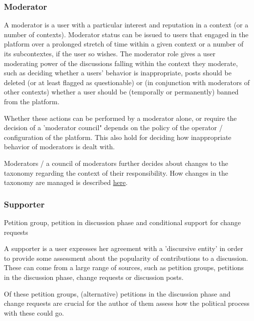 \subsubsection{Moderator}
\label{ssec:Roles_Moderator}
A moderator is a user with a particular interest and reputation in a context (or a number of contexts). Moderator status can be issued to users that engaged in the platform over a prolonged stretch of time within a given context or a number of its subcontextes, if the user so wishes. The moderator role gives a user moderating power of the discussions falling within the context they moderate, such as deciding whether a users' behavior is inappropriate, posts should be deleted (or at least flagged as questionable) or (in conjunction with moderators of other contexts) whether a user should be (temporally or permanently) banned from the platform. 

Whether these actions can be performed by a moderator alone, or require the decision of a 'moderator council" depends on the policy of the operator / configuration of the platform. This also hold for deciding how inappropriate behavior of moderators is dealt with.

Moderators / a council of moderators further decides about changes to the taxonomy regarding the context of their responsibility. How changes in the taxonomy are managed is described \hyperref[sec:Model_Contexts]{here}.

\subsubsection{Supporter}
\label{ssec:Roles_Supporter}
Petition group, petition in discussion phase and conditional support for change requests

A supporter is a user expresses her agreement with a 'discursive entity' in order to provide some assessment about the popularity of contributions to a discussion. These can come from a large range of sources, such as petition groups, petitions in the discussion phase, change requests or discussion posts. 

Of these petition groups, (alternative) petitions in the discussion phase and change requests are crucial for the author of them assess how the political process with these could go.

